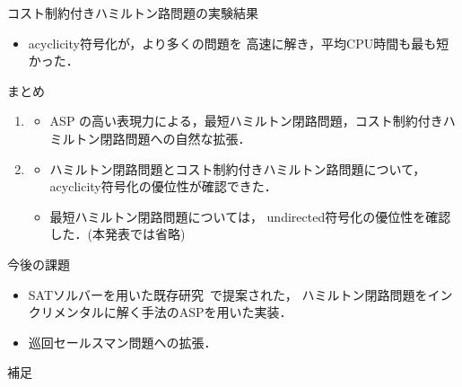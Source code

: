 \documentclass[dvipdfmx,11pt]{beamer}
\begin{document}
\begin{frame}{コスト制約付きハミルトン路問題の実験結果}

\begin{itemize}
\item \textsf{acyclicity}符号化が，より多くの問題を
  高速に解き，平均CPU時間も最も短かった．
\end{itemize}
    
\end{frame}

\begin{frame}{まとめ}
    \begin{enumerate}
    \item {}
      \begin{itemize}
      \item ASP の高い表現力による，最短ハミルトン閉路問題，コスト制約付きハミルトン閉路問題への自然な拡張．
      \end{itemize}
    \item {}
      \begin{itemize}
      \item ハミルトン閉路問題とコスト制約付きハミルトン路問題について，
        \textsf{acyclicity}符号化の優位性が確認できた．
      \item 最短ハミルトン閉路問題については，
        \textsf{undirected}符号化の優位性を確認した．(本発表では省略)
      \end{itemize}
    \end{enumerate}
  \begin{alertblock}{今後の課題}
    \begin{itemize}
    \item SATソルバーを用いた既存研究~\cite{soh14:jelia2014}で提案された，
      ハミルトン閉路問題をインクリメンタルに解く手法のASPを用いた実装．
    \item 巡回セールスマン問題への拡張．
    \end{itemize}
  \end{alertblock}
\end{frame}


\begin{frame}[noframenumbering]{}
  補足
\end{frame}
\end{document}
